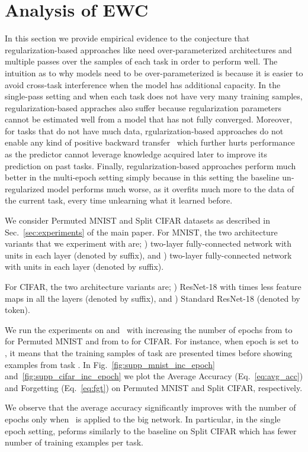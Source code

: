 \section{Analysis of EWC}
\label{sec:supp_increasing_epochs_and_arch}
In this section we provide empirical evidence to the conjecture that regularization-based approaches like \ewc need over-parameterized architectures and
multiple passes over the samples of each task in order to perform well. The intuition as to why models need to be over-parameterized is 
because it is easier to avoid cross-task interference when the model has additional capacity. 
In the single-pass setting and when each task does not have very many training samples, 
regularization-based appraches also suffer because regularization parameters cannot be estimated well from a model 
that has not fully converged. Moreover, for tasks that do not have much data, rgularization-based
approaches do not enable any kind of positive backward transfer~\citep{lopez2017gradient} which further hurts performance as the predictor cannot leverage knowledge
acquired later to improve its prediction on past tasks. Finally, regularization-based approaches perform much better in the multi-epoch setting simply because
in this setting the baseline un-regularized model performs much worse, as it overfits much more to the data of the current task, every time unlearning what it 
learned before.

We consider Permuted MNIST and Split CIFAR datasets as described in Sec.~\ref{sec:experiments} of the main paper. 
For MNIST, the two architecture variants that we experiment with are; ) two-layer fully-connected network with  units in each layer (denoted by  suffix), and ) 
two-layer fully-connected network with  units in each layer (denoted by  suffix). 

For CIFAR, the two architecture variants are; ) ResNet-18 with  times less feature maps in all the layers (denoted by  suffix), and 
) Standard ResNet-18 (denoted by  token).

We run the experiments on \van and \ewc\ with increasing the number of epochs from  to  for Permuted MNIST and from  to  for CIFAR. 
For instance, when epoch is set to , it means that the training samples of task  are presented  times before showing examples from task .
In Fig.~\ref{fig:supp_mnist_inc_epoch} and~\ref{fig:supp_cifar_inc_epoch} we plot the Average Accuracy (Eq.~\ref{eq:avg_acc}) and Forgetting (Eq.~\ref{eq:fgt}) 
on Permuted MNIST and Split CIFAR, respectively. 

We observe that the average accuracy significantly improves with the number of epochs only when \ewc\ is applied
to the big network. In particular, in the single epoch setting, \ewc peforms similarly to the baseline \van on Split CIFAR which has fewer number of training examples per 
task.

